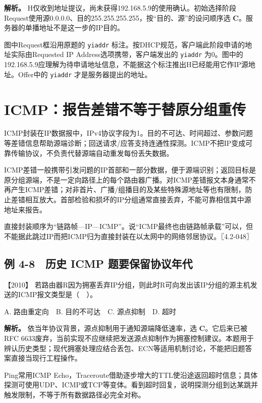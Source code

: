
\textbf{解析。} H仅收到地址提议，尚未获得192.168.5.9的使用确认。初始选择阶段Request使用源0.0.0.0、目的255.255.255.255，按``目的、源''的设问顺序选 \textbf{C}。服务器的单播地址不是这一步的IP目的。

图中Request框沿用原题的 \allowbreak{}\texttt{yiaddr} 标注。按DHCP规范，客户端此阶段申请的地址实际由Requested IP Address选项携带，客户端发出的 \allowbreak{}\texttt{yiaddr} 为0。图中的192.168.5.9应理解为待申请地址信息，不能据这个标注推出H已经能用它作IP源地址。Offer中的 \allowbreak{}\texttt{yiaddr} 才是服务器提出的地址。

\section{ICMP：报告差错不等于替原分组重传}\label{cn-04-13}

ICMP封装在IP数据报中，IPv4协议字段为1。目的不可达、时间超过、参数问题等差错信息帮助源端诊断；回送请求/应答支持连通性探测。ICMP不把IP变成可靠传输协议，不负责代替源端自动重发每份丢失数据。

ICMP差错一般携带引发问题的IP首部和一部分数据，便于源端识别；返回目标是原分组源端，不是一定向路径上的每个路由器广播。对ICMP差错报文本身通常不再产生ICMP差错；对非首片、广播/组播目的及某些特殊源地址等也有限制，防止差错相互放大。首部检验和损坏的IP分组通常直接丢弃，不能可靠相信其中源地址来报告。

直接封装顺序为``链路帧---IP---ICMP''。说``ICMP最终也由链路帧承载''可以，但不能据此跳过IP而把ICMP归为直接封装在以太网中的网络邻居协议。〖4.2-048〗

\subsection{例 4-8　历史 ICMP 题要保留协议年代}\label{cn-ex4-8}

\noindent{}【2010】 若路由器R因为拥塞丢弃IP分组，则此时R可向发出该IP分组的源主机发送的ICMP报文类型是（　）。

A. 路由重定向　B. 目的不可达　C. 源点抑制　D. 超时


\textbf{解析。} 依当年协议背景，源点抑制用于通知源端降低速率，选 \textbf{C}。它后来已被RFC 6633废弃，当前实现不应继续把发送源点抑制作为拥塞控制建议。本题用于辨认历史类型；现代拥塞处理应结合丢包、ECN等适用机制讨论，不能把旧题答案直接当现行工程操作。

Ping常用ICMP Echo，Traceroute借助逐步增大的TTL使沿途返回超时信息；具体探测可使用UDP、ICMP或TCP等变体。看到超时回复，说明探测分组到达某跳并触发限制，不等于所有数据路径必完全对称。

